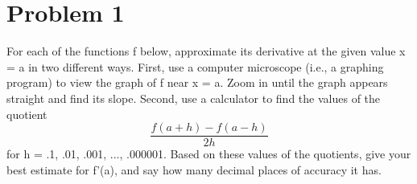 \documentclass[12pt,en,a4paper]{article}
\begin{document}
\begin{titlepage}
\begin{center}
\begin{minipage}{0.4\textwidth}
\begin{flushright}
				\end{flushright}
			\end{minipage}
			
			\vfill
			
			\vspace{2cm}
			{\large} %
		\end{center}
	\end{titlepage}
	
	\section*{Problem 1}
	For each of the functions f below, approximate its derivative at the given value x = a in two different ways. First, use a computer microscope (i.e., a graphing program) to view the graph of f near x = a. Zoom in until the graph appears straight and find its slope. Second, use a calculator to find the values of the quotient
	\[ 
	\frac{f(a+h)-f(a-h)}{2h}
	\]
	for h = .1, .01, .001, ..., .000001. Based on these values of the quotients, give your best estimate for f'(a), and say how many decimal places of accuracy it has.\par
\end{document}
